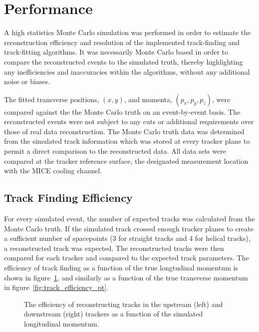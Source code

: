 \section{Performance}
\label{sec:Performance}

  A high statistics Monte Carlo simulation was performed in order to estimate the reconstruction efficiency and resolution of the implemented track-finding and track-fitting algorithms. It was necessarily Monte Carlo based in order to compare the reconstructed events to the simulated truth, thereby highlighting any inefficiencies and inaccuracies within the algorithms, without any additional noise or biases.

  The fitted transverse positions, $(x,y)$, and momenta, $(p_x, p_y, p_z)$, were compared against the the Monte Carlo truth on an event-by-event basis. The reconstructed events were not subject to any cuts or additional requirements over those of real data reconstruction. The Monte Carlo truth data was determined from the simulated track information which was stored at every tracker plane to permit a direct comparison to the reconstructed data. All data sets were compared at the tracker reference surface, the designated measurement location with the MICE cooling channel.

  \subsection{Track Finding Efficiency}
  \label{sec:performance:track_finding}
  For every simulated event, the number of expected tracks was calculated from the Monte Carlo truth. If the simulated track crossed enough tracker planes to create a sufficient number of spacepoints (3 for straight tracks and 4 for helical tracks), a reconstructed track was expected. The reconstructed tracks were then compared for each tracker and compared to the expected track parameters. The efficiency of track finding as a function of the true longtudinal momentum is shown in figure~\ref{fig:track_efficiency_pz}, and similarly as a function of the true transverse momentum in figure~\ref{fig:track_efficiency_pt}.

  \begin{figure}[p]
    \begin{center}
      \caption{\label{fig:track_efficiency_pz} The efficiency of reconstructing tracks in the upstream (left) and downstream (right) trackers as a function of the simulated longitudinal momentum.}
    \end{center}
  \end{figure}


